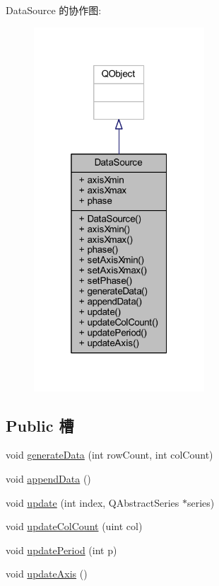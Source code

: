 Data\+Source 的协作图\+:
\nopagebreak
\begin{figure}[H]
\begin{center}
\leavevmode
\includegraphics[width=181pt]{class_data_source__coll__graph}
\end{center}
\end{figure}
\subsection*{Public 槽}
\begin{DoxyCompactItemize}
\item 
void \hyperlink{class_data_source_a497de454187a552636ad55a019f954b6}{generate\+Data} (int row\+Count, int col\+Count)
\item 
void \hyperlink{class_data_source_a441d29c53c284cbe24e66054e5ea2d5f}{append\+Data} ()
\item 
void \hyperlink{class_data_source_a062d2e31fd30def382a9ecd7bdf96f67}{update} (int index, Q\+Abstract\+Series $\ast$series)
\item 
void \hyperlink{class_data_source_a1dc22689c55dd2f548573048b139e1cc}{update\+Col\+Count} (uint col)
\item 
void \hyperlink{class_data_source_aee37693c57b35d37e12cca66f7fae7cd}{update\+Period} (int p)
\item 
void \hyperlink{class_data_source_a639b431dd2114b68e2f3fcca08e549c2}{update\+Axis} ()
\end{DoxyCompactItemize}
